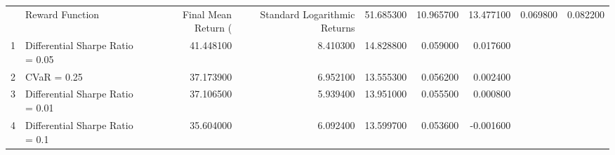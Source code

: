\begin{tabular}{llrrrrr}
\toprule
 & Reward Function & Final Mean Return (%
 & Standard Logarithmic Returns & 51.685300 & 10.965700 & 13.477100 & 0.069800 & 0.082200 \\
1 & Differential Sharpe Ratio = 0.05 & 41.448100 & 8.410300 & 14.828800 & 0.059000 & 0.017600 \\
2 & CVaR = 0.25 & 37.173900 & 6.952100 & 13.555300 & 0.056200 & 0.002400 \\
3 & Differential Sharpe Ratio = 0.01 & 37.106500 & 5.939400 & 13.951000 & 0.055500 & 0.000800 \\
4 & Differential Sharpe Ratio = 0.1 & 35.604000 & 6.092400 & 13.599700 & 0.053600 & -0.001600 \\
\bottomrule
\end{tabular}

